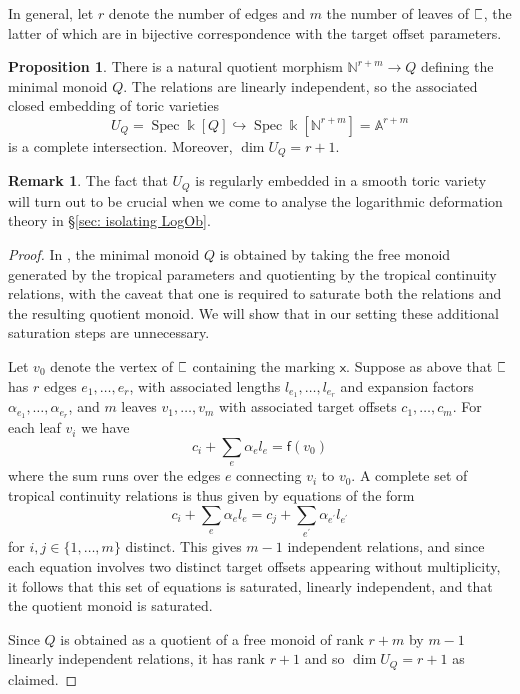 \documentclass[11pt]{amsart}
\theoremstyle{definition}
\theoremstyle{definition}
\newtheorem{proposition}[theorem]{Proposition}
\newtheorem{remark}[theorem]{Remark}
\newcommand{\sqC}{\scalebox{0.8}[1.2]{$\sqsubset$}}
\newcommand{\Aaff}{\mathbb{A}}
\newcommand{\N}{\mathbb{N}}
\newcommand{\kfield}{\Bbbk}
\newcommand{\Spec}{\operatorname{Spec}}
\begin{document}
In general, let $r$ denote the number of edges and $m$ the number of leaves of $\sqC$, the latter of which are in bijective correspondence with the target offset parameters.
\begin{proposition}\label{prop: minimal monoid} There is a natural quotient morphism $\N^{r+m} \to Q$ defining the minimal monoid $Q$. The relations are linearly independent, so the associated closed embedding of toric varieties
\begin{equation*} U_Q = \Spec \kfield[Q] \hookrightarrow \Spec \kfield[\N^{r+m}] = \Aaff^{r+m} \end{equation*}
is a complete intersection. Moreover, $\dim U_Q = r+1$.\end{proposition}

\begin{remark} The fact that $U_Q$ is regularly embedded in a smooth toric variety will turn out to be crucial when we come to analyse the logarithmic deformation theory in \S \ref{sec: isolating LogOb}. \end{remark}

\begin{proof} In \cite[\S 1.5]{GrossSiebertLog}, the minimal monoid $Q$ is obtained by taking the free monoid generated by the tropical parameters and quotienting by the tropical continuity relations, with the caveat that one is required to saturate both the relations and the resulting quotient monoid. We will show that in our setting these additional saturation steps are unnecessary.

Let $v_0$ denote the vertex of $\sqC$ containing the marking $\mathsf{x}$. Suppose as above that $\sqC$ has $r$ edges $e_1,\ldots,e_r$, with associated lengths $l_{e_1},\ldots,l_{e_r}$ and expansion factors $\alpha_{e_1},\ldots,\alpha_{e_r}$, and $m$ leaves $v_1,\ldots,v_m$ with associated target offsets $c_1,\ldots,c_m$. For each leaf $v_i$ we have
\begin{equation*} c_i + \sum_{e} \alpha_e  l_e = \mathsf{f}(v_0) \end{equation*}
where the sum runs over the edges $e$ connecting $v_i$ to $v_0$. A complete set of tropical continuity relations is thus given by equations of the form
\begin{equation} \label{eqn: tropical continuity relations} c_i + \sum_{e} \alpha_e l_e = c_j + \sum_{e^\prime} \alpha_{e^\prime} l_{e^\prime} \end{equation}
for $i,j \in \{1,\ldots,m\}$ distinct. This gives $m-1$ independent relations, and since each equation involves two distinct target offsets appearing without multiplicity, it follows that this set of equations is saturated, linearly independent, and that the quotient monoid is saturated.

Since $Q$ is obtained as a quotient of a free monoid of rank $r+m$ by $m-1$ linearly independent relations, it has rank $r+1$ and so $\dim U_Q = r+1$ as claimed.
\end{proof}
\end{document}
